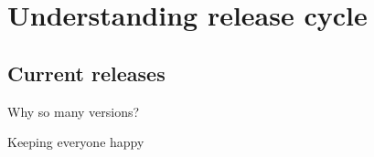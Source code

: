 \section{Understanding release cycle}
\subsection{Current releases}
\begin{frame}{Why so many versions?}
\end{frame}

\begin{frame}{Keeping everyone happy}
\end{frame}

